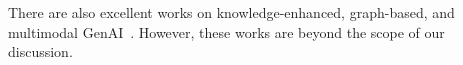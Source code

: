 There are also excellent works on knowledge-enhanced, graph-based, and multimodal GenAI~\cite{edge2024local,guo2024lightrag,wang2024knowledge,zhao2024kg,chen2022murag,hui2024uda,liu2020k,yasunaga2021qa,marino2019ok,mathew2021docvqa}. However, these works are beyond the scope of our discussion.




